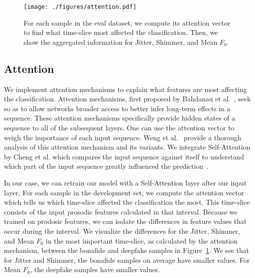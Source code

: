 \documentclass[10pt, journal, anonymous=true]{IEEEtran}
\begin{document}
\begin{figure}
	\centering
	\texttt{[image: ./figures/attention.pdf]}
	\caption{For each sample in the eval dataset, we compute its attention
	vector to find what time-slice most affected the classification. Then, 
	we show the aggregated information for Jitter, Shimmer, and Mean $F_0$.}
	\label{fig:attention}
\end{figure}

\subsection{Attention}
We implement attention mechanisms to explain 
what features are most affecting the classification.
Attention mechanisms, first proposed by Bahdanau et al.~\cite{bahdanau2014neural},
seek so as to allow networks broader access to better infer long-term effects
in a sequence. These attention mechanisms specifically provide
hidden states of a sequence to all of the subsequent layers.
One can use the attention vector to weigh the importance
of each input sequence. Weng et al.~\cite{weng2018attention} provide a
thorough analysis of this attention mechanism and its variants. We integrate
Self-Attention by Cheng et al. which compares
the input sequence against itself to understand which
part of the input sequence greatly influenced the prediction~\cite{cheng2016long}.

In our case, we can retrain our model with a Self-Attention layer after our input layer. 
For each sample in the development set, we 
compute the attention vector which tells us which time-slice affected the classification the most. This
time-slice consists of the input prosodic features calculated in that
interval. Because we trained on prodosic features, we can isolate the differences in feature values that occur during 
the interval. We visualize the differences for the Jitter, Shimmer, and
Mean $F_0$ in the most important time-slice, as calculated by the
attention mechanism, between the bonafide and deepfake samples
in Figure~\ref{fig:attention}. We see that for Jitter and Shimmer,
the bonafide samples on average have smaller values. For 
Mean $F_0$, the deepfake samples have smaller values. 
\\
\\ \noindent{}
\\
\end{document}
